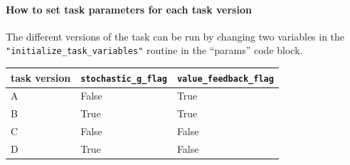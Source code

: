 \documentclass[11pt]{article}
\begin{document}
\paragraph{How to set task parameters for each task version}
\label{sec:org7f10680}
The different versions of the task can be run by changing two variables in the \texttt{"initialize\_task\_variables"} routine in the ``params'' code block.
\begin{table}[htbp]
\label{Table 3}
\centering
\begin{tabular}{lll}
task version & \texttt{stochastic\_g\_flag} & \texttt{value\_feedback\_flag}\\
\hline
A & False & True\\
B & True & True\\
C & False & False\\
D & True & False\\
\end{tabular}
\end{table}
\end{document}
